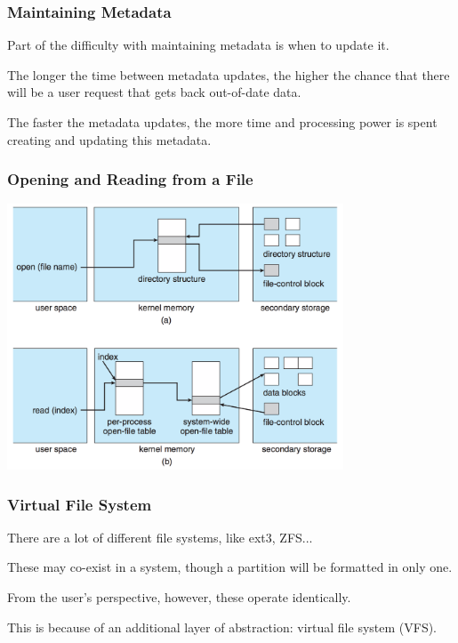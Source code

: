 \begin{frame}
\frametitle{Maintaining Metadata}

Part of the difficulty with maintaining metadata is when to update it. 

The longer the time between metadata updates, the higher the chance that there will be a user request that gets back out-of-date data. 

The faster the metadata updates, the more time and processing power is spent creating and updating this metadata.


\end{frame}

\begin{frame}
\frametitle{Opening and Reading from a File}

\begin{center}
	\includegraphics[width=0.75\textwidth]{images/file-system-structures.png}
\end{center}


\end{frame}

\begin{frame}
\frametitle{Virtual File System}

There are a lot of different file systems, like ext3, ZFS... 

These may co-exist in a system, though a partition will be formatted in only one.

From the user's perspective, however, these operate identically. 

This is because of an additional layer of abstraction: virtual file system (VFS). 

\end{frame}

